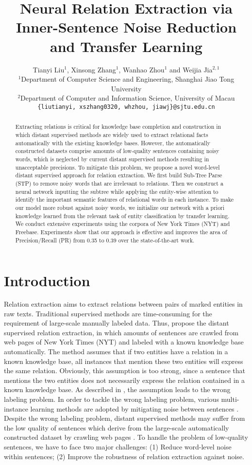 \documentclass[11pt,a4paper]{article}
\title{Neural Relation Extraction via Inner-Sentence Noise Reduction and Transfer Learning}
\author{Tianyi Liu$^1$, Xinsong Zhang$^1$, Wanhao Zhou$^1$ and Weijia Jia$^{2,1}$ \\
  $^1$Department of Computer Science and Engineering, Shanghai Jiao Tong University \\
  $^2$Department of Computer and Information Science, University of Macau \\
  {\tt \{liutianyi, xszhang0320, whzhou, jiawj\}@sjtu.edu.cn} \\}
\date{}
\begin{document}
\maketitle
\begin{abstract}
  Extracting relations is critical for knowledge base completion and construction in which distant supervised methods are widely used to extract relational facts automatically with the existing knowledge bases. However, the automatically constructed datasets comprise amounts of low-quality sentences containing noisy words, which is neglected by current distant supervised methods resulting in unacceptable precisions. To mitigate this problem, we propose a novel word-level distant supervised approach for relation extraction. We first build Sub-Tree Parse (STP) to remove noisy words that are irrelevant to relations. Then we construct a neural network inputting the subtree while applying the entity-wise attention to identify the important semantic features of relational words in each instance. To make our model more robust against noisy words, we initialize our network with a priori knowledge learned from the relevant task of entity classification by transfer learning. We conduct extensive experiments using the corpora of New York Times (NYT) and Freebase. Experiments show that our approach is effective and improves the area of Precision/Recall (PR) from 0.35 to 0.39 over the state-of-the-art work.
\end{abstract}

\section{Introduction}
  Relation extraction aims to extract relations between pairs of marked entities in raw texts. Traditional supervised methods are time-consuming for the requirement of large-scale manually labeled data. Thus, \citet{mintz2009distant} propose the distant supervised relation extraction, in which amounts of sentences are crawled from web pages of New York Times (NYT) and labeled with a known knowledge base automatically. The method assumes that if two entities have a relation in a known knowledge base, all instances that mention these two entities will express the same relation. Obviously, this assumption is too strong, since a sentence that mentions the two entities does not necessarily express the relation contained in a known knowledge base. As described in \citet{riedel2010modeling}, the assumption leads to the wrong labeling problem. In order to tackle the wrong labeling problem, various multi-instance learning methods are adopted by mitigating noise between sentences \citep{hoffmann2011knowledge,surdeanu2012multi,zeng2015distant,lin2016neural}. Despite the wrong labeling problem, distant supervised methods may suffer from the low quality of sentences which derive from the large-scale automatically constructed dataset by crawling web pages \citep{yang2017crowdsourced}. To handle the problem of low-quality sentences, we have to face two major challenges: (1) Reduce word-level noise within sentences; (2) Improve the robustness of relation extraction against noise.
  
\end{document}
